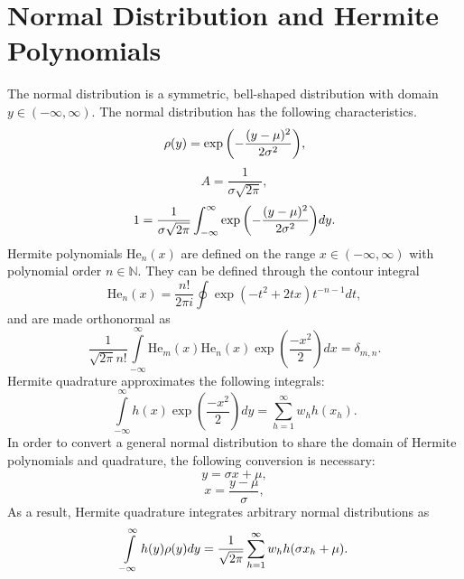 \section{Normal Distribution and Hermite Polynomials}
The normal distribution is a symmetric, bell-shaped distribution with domain $y\in(-\infty,\infty)$.  The
normal distribution has the following characteristics.
\begin{equation}
  \rho(y) = \exp\qty(-\frac{(y-\mu)^2}{2\sigma^2}),
\end{equation}
\begin{equation}
  A = \frac{1}{\sigma\sqrt{2\pi}},
\end{equation}
\begin{equation}
  1 =\frac{1}{\sigma\sqrt{2\pi}} \int_{-\infty}^\infty \exp\qty( -\frac{(y-\mu)^2}{2\sigma^2} )dy.
\end{equation}
Hermite polynomials $\text{He}_n(x)$ are defined on the range $x\in(-\infty,\infty)$ with polynomial order
$n\in\mathbb{N}$.  They can be defined through the contour integral \cite{polys}
\begin{equation}
  \text{He}_n(x) = \frac{n!}{2\pi i}\oint \exp(-t^2+2tx)t^{-n-1} dt,
\end{equation}
and are made orthonormal as
\begin{equation}
  \frac{1}{\sqrt{2\pi} n!}\int\limits_{-\infty}^\infty \text{He}_m(x)\text{He}_n(x) \exp(\frac{-x^2}{2}) dx = \delta_{m,n}.
\end{equation}
Hermite quadrature approximates the following integrals:
\begin{equation}
  \int\limits_{-\infty}^\infty h(x)\exp(\frac{-x^2}{2})dy = \sum_{h=1}^\infty w_h h(x_h).
\end{equation}
In order to convert a general normal distribution to share the domain of Hermite polynomials and quadrature,
the following conversion is necessary:
\begin{equation}
  y = \sigma x+\mu,
\end{equation}
\begin{equation}
  x = \frac{y-\mu}{\sigma},
\end{equation}
As a result, Hermite quadrature integrates arbitrary normal distributions as
\begin{equation}
  \int\limits_{-\infty}^\infty h(y)\rho(y)dy =\frac{1}{\sqrt{2\pi}} \sum_{h=1}^\infty w_h h(\sigma x_h+\mu).
\end{equation}



